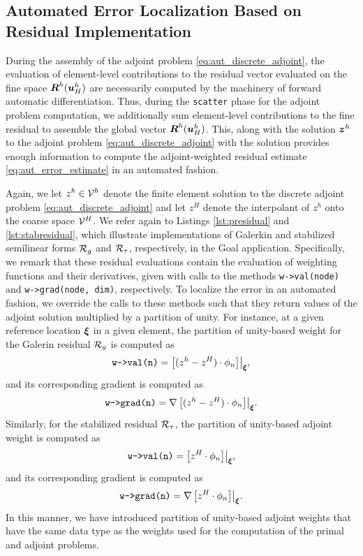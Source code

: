\subsection{Automated Error Localization Based on Residual Implementation}

During the assembly of the adjoint problem
\eqref{eq:aut_discrete_adjoint}, the evaluation of element-level
contributions to the residual vector evaluated on the fine space
$\boldsymbol{R}^h(\boldsymbol{u}^h_H)$ are necessarily computed by the machinery
of forward automatic differentiation. Thus,
during the \texttt{scatter} phase for the adjoint problem computation,
we additionally sum element-level contributions to the fine residual
to assemble the global vector $\boldsymbol{R}^h(\boldsymbol{u}^h_H)$. This, along
with the solution $\boldsymbol{z}^h$ to the adjoint problem
\eqref{eq:aut_discrete_adjoint} with the solution provides enough
information to compute the adjoint-weighted residual estimate
\eqref{eq:aut_error_estimate} in an automated fashion.

Again, we let $z^h \in \mathcal{V}^h$ denote the finite element solution to
the discrete adjoint problem \eqref{eq:aut_discrete_adjoint} and let
$z^H$ denote the interpolant of $z^h$ onto the coarse space $\mathcal{V}^H$.
We refer again to Listings \ref{lst:presidual} and \ref{lst:stabresidual},
which illustrate implementations of Galerkin and stabilized semilinear
forms $\mathcal{R}_g$ and $\mathcal{R}_{\tau}$, respectively, in the Goal application.
Specifically, we remark that these residual evaluations contain
the evaluation of weighting functions and their derivatives, given with
calls to the methods \texttt{w->val(node)} and \texttt{w->grad(node, dim)},
respectively. To localize the error in an automated fashion, we override
the calls to these methods such that they return values of the adjoint
solution multiplied by a partition of unity. For instance, at a given
reference location $\boldsymbol{\xi}$ in a given element, the
partition of unity-based
weight for the Galerin residual $\mathcal{R}_g$ is computed as
%
\begin{gather}
\texttt{w->val(n)} = \left[ (z^h - z^H) \cdot \phi_n \right] \bigr|_{\boldsymbol{\xi}},
\end{gather}
%
and its corresponding gradient is computed as
%
\begin{gather}
\texttt{w->grad(n)} = \nabla \left[ ( z^h - z^H) \cdot \phi_n \right] \bigr|_{\boldsymbol{\xi}}.
\end{gather}
%
Similarly, for the stabilized residual $\mathcal{R}_{\tau}$, the
partition of unity-based adjoint
weight is computed as
%
\begin{gather}
\texttt{w->val(n)} = \left[ z^H \cdot \phi_n \right] \bigr|_{\boldsymbol{\xi}},
\end{gather}
%
and its corresponding gradient is computed as
%
\begin{gather}
\texttt{w->grad(n)} = \nabla \left[  z^H \cdot \phi_n \right] \bigr|_{\boldsymbol{\xi}}.
\end{gather}
%
In this manner, we have introduced partition of unity-based adjoint weights
that have the
same data type as the weights used for the computation of the primal and
adjoint problems.

